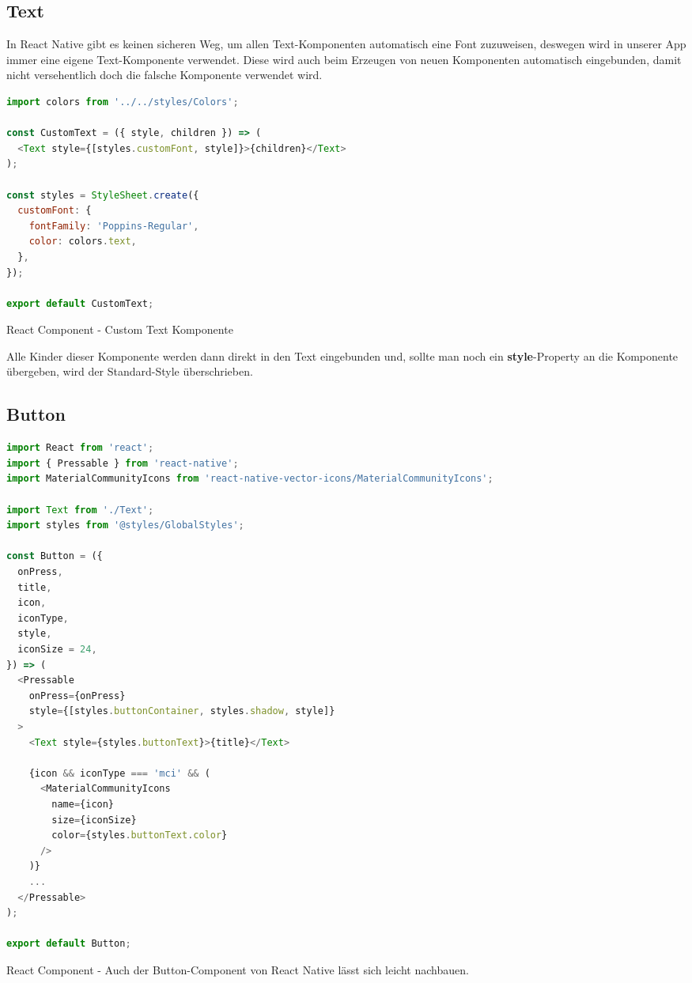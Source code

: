 \newpage
\subsection{Text}
In React Native gibt es keinen sicheren Weg, um allen Text-Komponenten automatisch eine Font
zuzuweisen, deswegen wird in unserer App immer eine eigene Text-Komponente verwendet. Diese wird
auch beim Erzeugen von neuen Komponenten automatisch eingebunden, damit nicht versehentlich doch die
falsche Komponente verwendet wird.

\begin{code}[htp]
\begin{lstlisting}[firstnumber=1,language=JavaScript, style=JSX]
import colors from '../../styles/Colors';

const CustomText = ({ style, children }) => (
  <Text style={[styles.customFont, style]}>{children}</Text>
);

const styles = StyleSheet.create({
  customFont: {
    fontFamily: 'Poppins-Regular',
    color: colors.text,
  },
});

export default CustomText;
\end{lstlisting}
\caption{React Component - Custom Text Komponente}
\end{code}

Alle Kinder dieser Komponente werden dann direkt in den Text eingebunden und, sollte man noch ein
\textbf{style}-Property an die Komponente übergeben, wird der Standard-Style überschrieben.

\newpage
\subsection{Button}
\begin{code}[htp]
\begin{lstlisting}[firstnumber=1,language=JavaScript, style=JSX]
import React from 'react';
import { Pressable } from 'react-native';
import MaterialCommunityIcons from 'react-native-vector-icons/MaterialCommunityIcons';

import Text from './Text';
import styles from '@styles/GlobalStyles';

const Button = ({
  onPress,
  title,
  icon,
  iconType,
  style,
  iconSize = 24,
}) => (
  <Pressable
    onPress={onPress}
    style={[styles.buttonContainer, styles.shadow, style]}
  >
    <Text style={styles.buttonText}>{title}</Text>

    {icon && iconType === 'mci' && (
      <MaterialCommunityIcons
        name={icon}
        size={iconSize}
        color={styles.buttonText.color}
      />
    )}
    ...
  </Pressable>
);

export default Button;

\end{lstlisting}
\caption{React Component - Auch der Button-Component von React Native lässt sich leicht nachbauen.}
\end{code}

